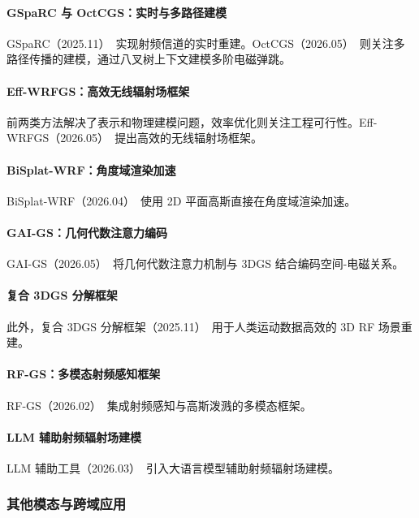 \paragraph{GSpaRC 与 OctCGS：实时与多路径建模}
GSpaRC（2025.11）~\cite{2511_22793}实现射频信道的实时重建。OctCGS（2026.05）~\cite{2605_22961}则关注多路径传播的建模，通过八叉树上下文建模多阶电磁弹跳。

\paragraph{Eff-WRFGS：高效无线辐射场框架}
前两类方法解决了表示和物理建模问题，效率优化则关注工程可行性。Eff-WRFGS（2026.05）~\cite{2605_15324}提出高效的无线辐射场框架。

\paragraph{BiSplat-WRF：角度域渲染加速}
BiSplat-WRF（2026.04）~\cite{2604_25945}使用 2D 平面高斯直接在角度域渲染加速。

\paragraph{GAI-GS：几何代数注意力编码}
GAI-GS（2026.05）~\cite{2605_19065}将几何代数注意力机制与 3DGS 结合编码空间-电磁关系。

\paragraph{复合 3DGS 分解框架}
此外，复合 3DGS 分解框架（2025.11）~\cite{2511_16966}用于人类运动数据高效的 3D RF 场景重建。

\paragraph{RF-GS：多模态射频感知框架}
RF-GS（2026.02）~\cite{2602_17124}集成射频感知与高斯泼溅的多模态框架。

\paragraph{LLM 辅助射频辐射场建模}
LLM 辅助工具（2026.03）~\cite{2603_04368}引入大语言模型辅助射频辐射场建模。

\subsubsection{其他模态与跨域应用}

